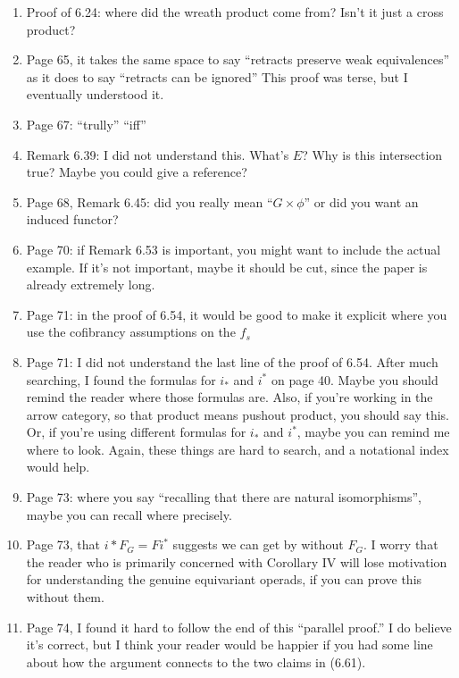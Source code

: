 \documentclass{article}
\begin{document}
\begin{enumerate}
\item
Proof of 6.24: where did the wreath product come from? Isn't it just a cross product?

\item
Page 65, it takes the same space to say ``retracts preserve weak equivalences'' as it does to say ``retracts can be ignored''
This proof was terse, but I eventually understood it.

\item
Page 67: ``trully''
``iff''

\item
Remark 6.39: I did not understand this. What's $E$? Why is this intersection true? Maybe you could give a reference?

\item
Page 68, Remark 6.45: did you really mean ``$G \times \phi$'' or did you want an induced functor?

\item
Page 70: if Remark 6.53 is important, you might want to include the actual example. If it's not important, maybe it should be cut, since the paper is already extremely long.

\item
Page 71: in the proof of 6.54, it would be good to make it explicit where you use the cofibrancy assumptions on the $f_s$

\item
Page 71: I did not understand the last line of the proof of 6.54. After much searching, I found the formulas for $i_*$ and $i^*$ on page 40. Maybe you should remind the reader where those formulas are. Also, if you're working in the arrow category, so that product means pushout product, you should say this. Or, if you're using different formulas for $i_*$ and $i^*$, maybe you can remind me where to look. Again, these things are hard to search, and a notational index would help.

\item
Page 73: where you say ``recalling that there are natural isomorphisms'', maybe you can recall where precisely.

\item
Page 73, that $i* F_G = F i^*$ suggests we can get by without $F_G$. I worry that the reader who is primarily concerned with Corollary IV will lose motivation for understanding the genuine equivariant operads, if you can prove this without them.

\item
Page 74, I found it hard to follow the end of this ``parallel proof.'' I do believe it's correct, but I think your reader would be happier if you had some line about how the argument connects to the two claims in (6.61).


\end{enumerate}
\end{document}

